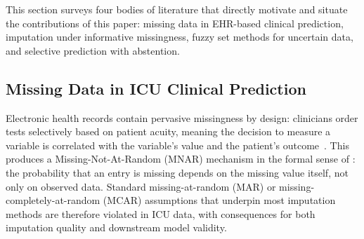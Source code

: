 \documentclass[a4paper,fleqn,longmktitle]{cas-sc}
\begin{document}
	This section surveys four bodies of literature that directly
	motivate and situate the contributions of this paper:
	missing data in EHR-based clinical prediction, imputation
	under informative missingness, fuzzy set methods for
	uncertain data, and selective prediction with abstention.
	
	\subsection{Missing Data in ICU Clinical Prediction}
	\label{sec:rw_missing}
	
	Electronic health records contain pervasive missingness by design:
	clinicians order tests selectively based on patient acuity,
	meaning the decision to measure a variable is correlated with
	the variable's value and the patient's
	outcome~\citep{agniel2018biases}.
	This produces a Missing-Not-At-Random (MNAR) mechanism in the
	formal sense of \citet{rubin1976inference}: the probability
	that an entry is missing depends on the missing value itself,
	not only on observed data.
	Standard missing-at-random (MAR) or missing-completely-at-random
	(MCAR) assumptions that underpin most imputation methods are
	therefore violated in ICU data, with consequences for both
	imputation quality and downstream model validity.
	
\end{document}
